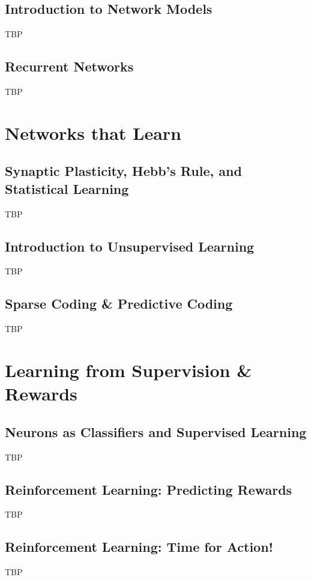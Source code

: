 \documentclass[]{article}
\begin{document}
\subsection{Introduction to Network Models}
TBP

\subsection{Recurrent Networks}
TBP

\section{Networks that Learn}\label{sec:week7}

\subsection{Synaptic Plasticity, Hebb's Rule, and Statistical Learning}
TBP

\subsection{Introduction to Unsupervised Learning}
TBP

\subsection{Sparse Coding \& Predictive Coding}
TBP

\section{Learning from Supervision \& Rewards}\label{sec:week8}

\subsection{Neurons as Classifiers and Supervised Learning}
TBP

\subsection{Reinforcement Learning: Predicting Rewards}
TBP

\subsection{Reinforcement Learning: Time for Action!}
TBP

\appendix

\printglossaries




\end{document}
